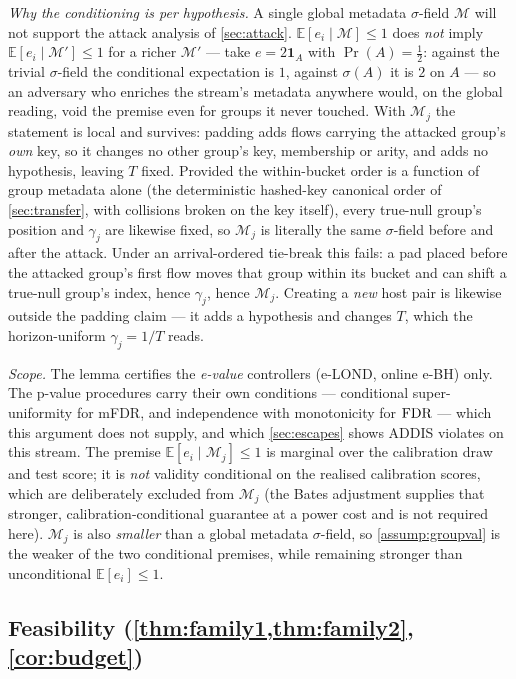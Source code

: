 \emph{Why the conditioning is per hypothesis.} A single global metadata $\sigma$-field $\mathcal{M}$
will not support the attack analysis of \cref{sec:attack}. $\mathbb{E}[e_i\mid\mathcal{M}]\le1$ does
\emph{not} imply $\mathbb{E}[e_i\mid\mathcal{M}']\le1$ for a richer $\mathcal{M}'$ --- take
$e=2\mathbf 1_A$ with $\Pr(A)=\tfrac12$: against the trivial $\sigma$-field the conditional
expectation is $1$, against $\sigma(A)$ it is $2$ on $A$ --- so an adversary who enriches the stream's
metadata anywhere would, on the global reading, void the premise even for groups it never touched.
With $\mathcal{M}_j$ the statement is local and survives: padding adds flows carrying the attacked
group's \emph{own} key, so it changes no other group's key, membership or arity, and adds no
hypothesis, leaving $T$ fixed. Provided the within-bucket order is a function of group metadata alone
(the deterministic hashed-key canonical order of \cref{sec:transfer}, with collisions broken on the
key itself), every true-null group's position and $\gamma_j$ are likewise fixed, so $\mathcal{M}_j$ is
literally the same $\sigma$-field before and after the attack. Under an arrival-ordered tie-break this
fails: a pad placed before the attacked group's first flow moves that group within its bucket and can
shift a true-null group's index, hence $\gamma_j$, hence $\mathcal{M}_j$. Creating a \emph{new} host
pair is likewise outside the padding claim --- it adds a hypothesis and changes $T$, which the
horizon-uniform $\gamma_j=1/T$ reads.

\emph{Scope.} The lemma certifies the \emph{e-value} controllers (e-LOND, online e-BH) only. The
p-value procedures carry their own conditions --- conditional super-uniformity for mFDR, and
independence with monotonicity for $\mathrm{FDR}$ --- which this argument does not supply, and which
\cref{sec:escapes} shows ADDIS violates on this stream. The premise
$\mathbb{E}[e_i\mid\mathcal{M}_j]\le1$ is marginal over the calibration draw and test score; it is
\emph{not} validity conditional on the realised calibration scores, which are deliberately excluded
from $\mathcal{M}_j$ (the Bates adjustment supplies that stronger, calibration-conditional guarantee at
a power cost and is not required here). $\mathcal{M}_j$ is also \emph{smaller} than a global
metadata $\sigma$-field, so \cref{assump:groupval} is the weaker of the two conditional premises,
while remaining stronger than unconditional $\mathbb{E}[e_i]\le1$.

\subsection{Feasibility (\cref{thm:family1,thm:family2}, \cref{cor:budget})}

